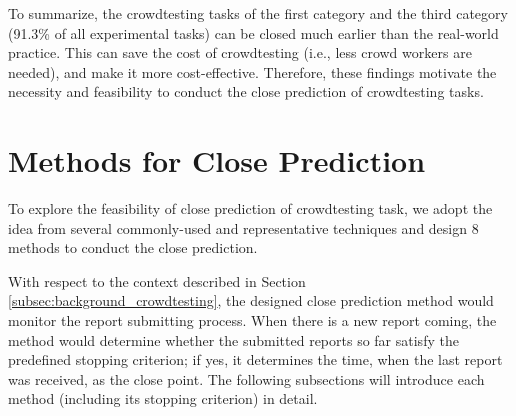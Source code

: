 \documentclass[sigconf,review, anonymous]{acmart}
\begin{document}
To summarize, the crowdtesting tasks of the first category and the third category (91.3\% of all experimental tasks) can be closed much earlier than the real-world practice.
This can save the cost of crowdtesting (i.e., less crowd workers are needed), and make it more cost-effective.
Therefore, these findings motivate the necessity and feasibility to conduct the close prediction of crowdtesting tasks. 


\section{Methods for Close Prediction}
\label{sec:approach}

To explore the feasibility of close prediction of crowdtesting task, we adopt the idea from several commonly-used and representative techniques \cite{lyu1996handbook,yamada2014software} and design 8 methods to conduct the close prediction.

With respect to the context described in Section \ref{subsec:background_crowdtesting}, the designed close prediction method would monitor the report submitting process.
When there is a new report coming, the method would determine whether the submitted reports so far satisfy the predefined stopping criterion; if yes, it determines the time, when the last report was received, as the close point.
The following subsections will introduce each method (including its stopping criterion) in detail. 

 
 
\end{document}
